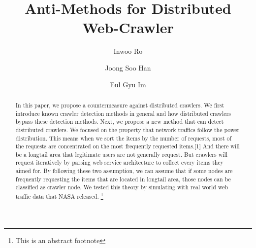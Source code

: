 \documentclass[sigconf,anonymous=false]{acmart}
\begin{document}
\title{Anti-Methods for Distributed Web-Crawler}

\author{Inwoo Ro}

\author{Joong Soo Han}

\author{Eul Gyu Im}

\renewcommand{\shortauthors}{B. Trovato et al.}


\begin{abstract}
In this paper, we propose a countermeasure against distributed crawlers. We first introduce known crawler detection methods in general and how distributed crawlers bypass these detection methods. Next, we propose a new method that can detect distributed crawlers. We focused on the property that network traffics follow the power distribution. This means when we sort the items by the number of requests, most of the requests are concentrated on the most frequently requested items.[1] And there will be a longtail area that legitimate users are not generally request. But crawlers will request iteratively by parsing web service architecture to collect every items they aimed for. By following these two assumption, we can assume that if some nodes are frequently requesting the items that are located in longtail area, those nodes can be classified as crawler node. We tested this theory by simulating with real world web traffic data that NASA released. \footnote{This is an abstract footnote}
\end{abstract}



\maketitle
\end{document}
